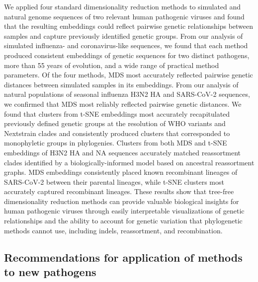 \documentclass[10pt,letterpaper]{article}
\begin{document}
We applied four standard dimensionality reduction methods to simulated and natural genome sequences of two relevant human pathogenic viruses and found that the resulting embeddings could reflect pairwise genetic relationships between samples and capture previously identified genetic groups.
From our analysis of simulated influenza- and coronavirus-like sequences, we found that each method produced consistent embeddings of genetic sequences for two distinct pathogens, more than 55 years of evolution, and a wide range of practical method parameters.
Of the four methods, MDS most accurately reflected pairwise genetic distances between simulated samples in its embeddings.
From our analysis of natural populations of seasonal influenza H3N2 HA and SARS-CoV-2 sequences, we confirmed that MDS most reliably reflected pairwise genetic distances.
We found that clusters from t-SNE embeddings most accurately recapitulated previously defined genetic groups at the resolution of WHO variants and Nextstrain clades and consistently produced clusters that corresponded to monophyletic groups in phylogenies.
Clusters from both MDS and t-SNE embeddings of H3N2 HA and NA sequences accurately matched reassortment clades identified by a biologically-informed model based on ancestral reassortment graphs.
MDS embeddings consistently placed known recombinant lineages of SARS-CoV-2 between their parental lineages, while t-SNE clusters most accurately captured recombinant lineages.
These results show that tree-free dimensionality reduction methods can provide valuable biological insights for human pathogenic viruses through easily interpretable visualizations of genetic relationships and the ability to account for genetic variation that phylogenetic methods cannot use, including indels, reassortment, and recombination.

\subsection*{Recommendations for application of methods to new pathogens}
\end{document}
